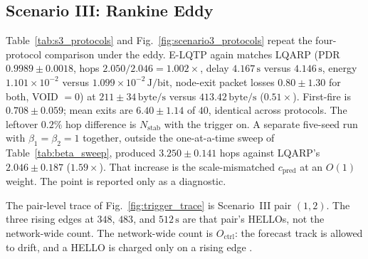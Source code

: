 \subsection{Scenario III: Rankine Eddy}
\label{sec:eval:s3}

Table~\ref{tab:s3_protocols} and Fig.~\ref{fig:scenario3_protocols}
repeat the four-protocol comparison under the eddy.
E-LQTP again matches LQARP (PDR $0.9989\pm 0.0018$, hops
$2.050/2.046=1.002\times$, delay $4.167\,\mathrm{s}$ versus
$4.146\,\mathrm{s}$, energy $1.101\times 10^{-2}$ versus
$1.099\times 10^{-2}\,\mathrm{J/bit}$, node-exit packet losses
$0.80\pm 1.30$ for both, VOID $=0$) at
$211\pm 34\,\mathrm{byte/s}$ versus
$413.42\,\mathrm{byte/s}$ ($0.51\times$).
First-fire is $0.708\pm 0.059$; mean exits are $6.40\pm 1.14$ of
$40$, identical across protocols.
The leftover $0.2\%$ hop difference is $N_{\mathrm{stab}}$ with the
trigger on.
A separate five-seed run with $\beta_1=\beta_2=1$ together, outside
the one-at-a-time sweep of Table~\ref{tab:beta_sweep}, produced
$3.250\pm 0.141$ hops against LQARP's $2.046\pm 0.187$
($1.59\times$).
That increase is the scale-mismatched $c_{\mathrm{pred}}$ at an
$O(1)$ weight.
The point is reported only as a diagnostic.



The pair-level trace of Fig.~\ref{fig:trigger_trace} is
Scenario~III pair $(1,2)$.
The three rising edges at $348$, $483$, and $512\,\mathrm{s}$ are
that pair's HELLOs, not the network-wide count.
The network-wide count is $O_{\mathrm{ctrl}}$: the forecast track
is allowed to drift, and a HELLO is charged only on a rising edge
\cite{li2026dse,priel2023consensus}.
